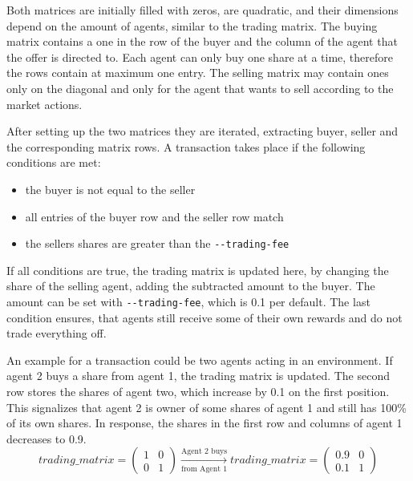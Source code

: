 Both matrices are initially filled with zeros, are quadratic, and their dimensions depend on the amount of agents, similar to the trading matrix. The buying matrix contains a one in the row of the buyer and the column of the agent that the offer is directed to.
Each agent can only buy one share at a time, therefore the rows contain at maximum one entry. The selling matrix may contain ones only on the diagonal and only for the agent that wants to sell according to the market actions.

After setting up the two matrices they are iterated, extracting buyer, seller and the corresponding matrix rows. A transaction takes place if the following conditions are met:
\begin{itemize}
    \item the buyer is not equal to the seller
    \item all entries of the buyer row and the seller row match
    \item the sellers shares are greater than the \verb|--trading-fee|
\end{itemize}

If all conditions are true, the trading matrix is updated here, by changing the share of the selling agent, adding the subtracted amount to the buyer. The amount can be set with \verb|--trading-fee|, which is 0.1 per default. The last condition ensures, that agents still receive some of their own rewards and do not trade everything off. 

An example for a transaction could be two agents acting in an environment. If agent 2 buys a share from agent 1, the trading matrix is updated. The second row stores the shares of agent two, which increase by 0.1 on the first position. This signalizes that agent 2 is owner of some shares of agent 1 and still has 100\% of its own shares. In response, the shares in the first row and columns of agent 1 decreases to 0.9.
\begin{equation*}
trading\_matrix = 
\begin{pmatrix}
1 & 0 \\
0 & 1
\end{pmatrix} \xrightarrow[\text{from Agent 1}]{\text{Agent 2 buys}} 
trading\_matrix = 
\begin{pmatrix}
0.9 & 0 \\
0.1 & 1
\end{pmatrix} 
\end{equation*}

